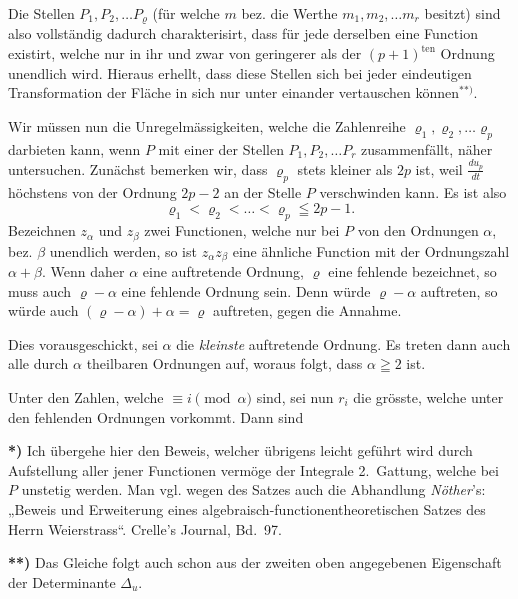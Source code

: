 \documentclass{article}
\begin{document}
Die Stellen $P_1, P_2, \dots P_\varrho$ (für welche $m$ bez. die Werthe $m_1, m_2, \dots m_r$ besitzt) sind also vollständig dadurch charakterisirt, dass für jede derselben eine Function existirt, welche nur in ihr und zwar von geringerer als der $(p+1)^{\text{ten}}$ Ordnung unendlich wird. Hieraus erhellt, dass diese Stellen sich bei jeder eindeutigen Transformation der Fläche in sich nur unter einander vertauschen können${}^{**)}$.

Wir müssen nun die Unregelmässigkeiten, welche die Zahlenreihe $\varrho_1, \varrho_2, \dots \varrho_p$ darbieten kann, wenn $P$ mit einer der Stellen $P_1, P_2, \dots P_r$ zusammenfällt, näher untersuchen. Zunächst bemerken wir, dass $\varrho_p$ stets kleiner als $2p$ ist, weil $\frac{du_p}{dt}$ höchstens von der Ordnung $2p-2$ an der Stelle $P$ verschwinden kann. Es ist also
\[
\varrho_1 < \varrho_2 < \dots < \varrho_p \leqq 2p - 1.
\tag{6}
\]
Bezeichnen $z_\alpha$ und $z_\beta$ zwei Functionen, welche nur bei $P$ von den Ordnungen $\alpha$, bez. $\beta$ unendlich werden, so ist $z_\alpha z_\beta$ eine ähnliche Function mit der Ordnungszahl $\alpha + \beta$. Wenn daher $\alpha$ eine auftretende Ordnung, $\varrho$ eine fehlende bezeichnet, so muss auch $\varrho - \alpha$ eine fehlende Ordnung sein. Denn würde $\varrho - \alpha$ auftreten, so würde auch $(\varrho - \alpha) + \alpha = \varrho$ auftreten, gegen die Annahme.

Dies vorausgeschickt, sei $\alpha$ die \emph{kleinste} auftretende Ordnung. Es treten dann auch alle durch $\alpha$ theilbaren Ordnungen auf, woraus folgt, dass $\alpha \geqq 2$ ist.

Unter den Zahlen, welche $\equiv i \pmod \alpha$ sind, sei nun $r_i$ die grösste, welche unter den fehlenden Ordnungen vorkommt. Dann sind

\textbf{*)} Ich übergehe hier den Beweis, welcher übrigens leicht geführt wird durch Aufstellung aller jener Functionen vermöge der Integrale 2.~Gattung, welche bei $P$ unstetig werden. Man vgl. wegen des Satzes auch die Abhandlung \emph{Nöther}'s: „Beweis und Erweiterung eines algebraisch-functionentheoretischen Satzes des Herrn Weierstrass“. Crelle's Journal, Bd.~97.

\textbf{**)} Das Gleiche folgt auch schon aus der zweiten oben angegebenen Eigenschaft der Determinante $\Delta_u$.
\end{document}
